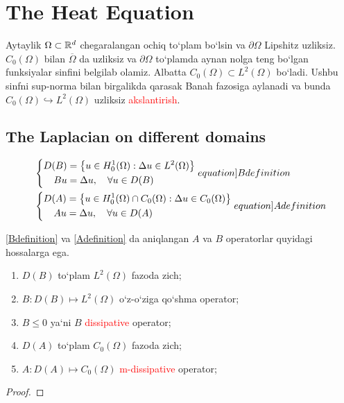 \section{The Heat Equation}
Aytaylik $\Omega\subset {\mathbb{R}^{d}}$ chegaralangan ochiq to`plam bo`lsin va $\partial\Omega$ Lipshitz uzliksiz. $C_0(\Omega)$ bilan $\overline{\Omega}$ da uzliksiz va $\partial\Omega$ to`plamda aynan nolga teng bo`lgan funksiyalar sinfini belgilab olamiz. Albatta $C_0(\Omega)\subset L^2(\Omega)$ bo`ladi. Ushbu sinfni sup-norma bilan birgalikda qarasak Banah fazosiga aylanadi va bunda $C_0(\Omega)\hookrightarrow L^2(\Omega)$ uzliksiz \textcolor{red}{akslantirish}.
\subsection{The Laplacian on different domains}
\begin{align}
    &\left\{\begin{aligned}
        D(B)&=\left\{u\in H_0^1(\Omega): \Delta u\in L^2(\Omega)\right\}\\
        Bu&=\Delta u, \quad \forall u\in D(B)
    \end{aligned}\right. \label[equation]{Bdefinition}\\
    &\left\{\begin{aligned}
        D(A)&=\left\{u\in H_0^1(\Omega)\cap C_0(\Omega): \Delta u\in C_0(\Omega)\right\}\\
        Au&=\Delta u, \quad \forall u\in D(A)
    \end{aligned}\right. \label[equation]{Adefinition}
\end{align}
\begin{proposition}
    \eqref{Bdefinition} va \eqref{Adefinition} da aniqlangan $A$ va $B$ operatorlar quyidagi hossalarga ega.
    \begin{enumerate}
        \item $D(B)$ to`plam $L^2(\Omega)$ fazoda zich;
        \item $B:D(B)\mapsto L^2(\Omega)$ o`z-o`ziga qo`shma operator;
        \item $B\le 0$ ya`ni $B$ \textcolor{red}{dissipative} operator;
        \item $D(A)$ to`plam $C_0(\Omega)$ fazoda zich;
        \item $A:D(A)\mapsto C_0(\Omega)$ \textcolor{red}{m-dissipative} operator;
    \end{enumerate}
\end{proposition}
\begin{proof}
    
\end{proof}

